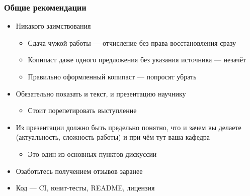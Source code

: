 \documentclass{../../slides-style}
\begin{document}
    \begin{frame}
        \frametitle{Общие рекомендации}
        \begin{itemize}
            \item Никакого заимствования 
            \begin{itemize}
                \item Сдача чужой работы --- отчисление без права восстановления сразу
                \item Копипаст даже одного предложения без указания источника --- незачёт
                \item Правильно оформленный копипаст --- попросят убрать
            \end{itemize}
            \item Обязательно показать и текст, и презентацию научнику
            \begin{itemize}
                \item Стоит порепетировать выступление
            \end{itemize}
            \item Из презентации должно быть предельно понятно, что и зачем вы делаете (актуальность, сложность работы) и при чём тут ваша кафедра
            \begin{itemize}
                \item Это один из основных пунктов дискуссии
            \end{itemize}
            \item Озаботьтесь получением отзывов заранее
            \item Код --- CI, юнит-тесты, README, лицензия
        \end{itemize}
    \end{frame}
\end{document}
